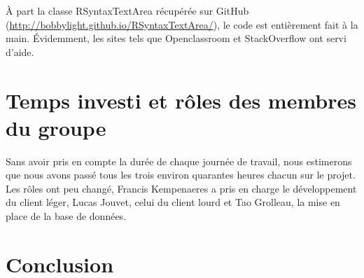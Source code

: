 \documentclass[a4paper, 12pt]{article}
\begin{document}
À part la classe RSyntaxTextArea récupérée sur GitHub (\url{http://bobbylight.github.io/RSyntaxTextArea/}), le code est entièrement fait à la main. Évidemment, les sites tels que Openclassroom et StackOverflow ont servi d'aide. 

\section{Temps investi et rôles des membres du groupe}

Sans avoir pris en compte la durée de chaque journée de travail, nous estimerons que nous avons passé tous les trois environ quarantes heures chacun sur le projet.
Les rôles ont peu changé, Francis Kempenaeres a pris en charge le développement du client léger, Lucas Jouvet, celui du client lourd et Tao Grolleau, la mise en place de la base de données. 

\section{Conclusion}
\end{document}
